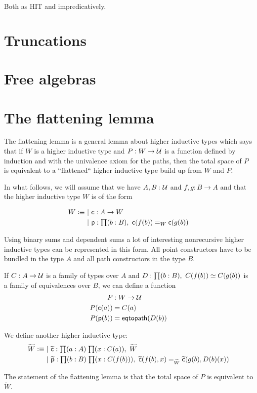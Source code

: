 Both as HIT and impredicatively.

\section{Truncations}
\label{sec:truncations}

\section{Free algebras}
\label{sec:free-algebras}

\section{The flattening lemma}
\label{sec:flattening}

The flattening lemma is a general lemma about higher inductive types which says
that if $W$ is a higher inductive type and $P:W\to\mathcal{U}$ is a function defined
by induction and with the univalence axiom for the paths, then the total space
of $P$ is equivalent to a “flattened“ higher inductive type build up from $W$
and $P$.

In what follows, we will assume that we have $A,B:\mathcal{U}$ and $f,g:B\to{}A$ and
that the higher inductive type $W$ is of the form

\newcommand{\cc}{\mathsf{c}}
\newcommand{\pp}{\mathsf{p}}
\newcommand{\cct}{\widetilde{\mathsf{c}}}
\newcommand{\ppt}{\widetilde{\mathsf{p}}}

\begin{align*}
  W \defeq&\ |\ \cc:A\to{}W\\
  &\ |\ \pp:\prd{b:B}\cc(f(b))=_W\cc(g(b))
\end{align*}

Using binary sums and dependent sums a lot of interesting nonrecursive higher
inductive types can be represented in this form. All point constructors have to
be bundled in the type $A$ and all path constructors in the type $B$.

\begin{lem}
  If $C:A\to\mathcal{U}$ is a family of types over $A$ and
  $D:\prd{b:B}C(f(b))\simeq{}C(g(b))$ is a family of equivalences over $B$, we
  can define a function
  \begin{align*}
    P &: W\to\type\\
    P(\cc(a)) &= C(a)\\
    \map{P}{\pp(b)} &= \eqtopath(D(b))
  \end{align*}

  We define another higher inductive type:
  \begin{align*}
    \widetilde{W} \defeq&\ |\ \cct:\prd{a:A}{x:C(a)}\widetilde{W}\\
    &\ |\
    \ppt:\prd{b:B}{x:C(f(b))}\cct(f(b),x)=_{\widetilde{W}}\cct(g(b),D(b)(x))
  \end{align*}

  The statement of the flattening lemma is that the total space of $P$ is
  equivalent to $\widetilde{W}$.
\end{lem}

